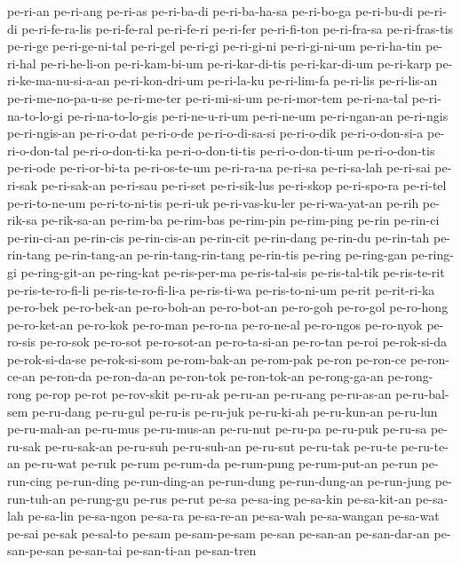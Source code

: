 {pe-ri-an pe-ri-ang pe-ri-as pe-ri-ba-di pe-ri-ba-ha-sa pe-ri-bo-ga
pe-ri-bu-di pe-ri-di pe-ri-fe-ra-lis pe-ri-fe-ral pe-ri-fe-ri pe-ri-fer
pe-ri-fi-ton pe-ri-fra-sa pe-ri-fras-tis pe-ri-ge pe-ri-ge-ni-tal
pe-ri-gel pe-ri-gi pe-ri-gi-ni pe-ri-gi-ni-um pe-ri-ha-tin pe-ri-hal
pe-ri-he-li-on pe-ri-kam-bi-um pe-ri-kar-di-tis pe-ri-kar-di-um pe-ri-karp
pe-ri-ke-ma-nu-si-a-an pe-ri-kon-dri-um pe-ri-la-ku pe-ri-lim-fa pe-ri-lis
pe-ri-lis-an pe-ri-me-no-pa-u-se pe-ri-me-ter pe-ri-mi-si-um pe-ri-mor-tem
pe-ri-na-tal pe-ri-na-to-lo-gi pe-ri-na-to-lo-gis pe-ri-ne-u-ri-um
pe-ri-ne-um pe-ri-ngan-an pe-ri-ngis pe-ri-ngis-an pe-ri-o-dat pe-ri-o-de
pe-ri-o-di-sa-si pe-ri-o-dik pe-ri-o-don-si-a pe-ri-o-don-tal
pe-ri-o-don-ti-ka pe-ri-o-don-ti-tis pe-ri-o-don-ti-um pe-ri-o-don-tis
pe-ri-ode pe-ri-or-bi-ta pe-ri-os-te-um pe-ri-ra-na pe-ri-sa pe-ri-sa-lah
pe-ri-sai pe-ri-sak pe-ri-sak-an pe-ri-sau pe-ri-set pe-ri-sik-lus
pe-ri-skop pe-ri-spo-ra pe-ri-tel pe-ri-to-ne-um pe-ri-to-ni-tis pe-ri-uk
pe-ri-vas-ku-ler pe-ri-wa-yat-an pe-rih pe-rik-sa pe-rik-sa-an pe-rim-ba
pe-rim-bas pe-rim-pin pe-rim-ping pe-rin pe-rin-ci pe-rin-ci-an pe-rin-cis
pe-rin-cis-an pe-rin-cit pe-rin-dang pe-rin-du pe-rin-tah pe-rin-tang
pe-rin-tang-an pe-rin-tang-rin-tang pe-rin-tis pe-ring pe-ring-gan
pe-ring-gi pe-ring-git-an pe-ring-kat pe-ris-per-ma pe-ris-tal-sis
pe-ris-tal-tik pe-ris-te-rit pe-ris-te-ro-fi-li pe-ris-te-ro-fi-li-a
pe-ris-ti-wa pe-ris-to-ni-um pe-rit pe-rit-ri-ka pe-ro-bek pe-ro-bek-an
pe-ro-boh-an pe-ro-bot-an pe-ro-goh pe-ro-gol pe-ro-hong pe-ro-ket-an
pe-ro-kok pe-ro-man pe-ro-na pe-ro-ne-al pe-ro-ngos pe-ro-nyok pe-ro-sis
pe-ro-sok pe-ro-sot pe-ro-sot-an pe-ro-ta-si-an pe-ro-tan pe-roi
pe-rok-si-da pe-rok-si-da-se pe-rok-si-som pe-rom-bak-an pe-rom-pak pe-ron
pe-ron-ce pe-ron-ce-an pe-ron-da pe-ron-da-an pe-ron-tok pe-ron-tok-an
pe-rong-ga-an pe-rong-rong pe-rop pe-rot pe-rov-skit pe-ru-ak pe-ru-an
pe-ru-ang pe-ru-as-an pe-ru-bal-sem pe-ru-dang pe-ru-gul pe-ru-is
pe-ru-juk pe-ru-ki-ah pe-ru-kun-an pe-ru-lun pe-ru-mah-an pe-ru-mus
pe-ru-mus-an pe-ru-nut pe-ru-pa pe-ru-puk pe-ru-sa pe-ru-sak pe-ru-sak-an
pe-ru-suh pe-ru-suh-an pe-ru-sut pe-ru-tak pe-ru-te pe-ru-te-an pe-ru-wat
pe-ruk pe-rum pe-rum-da pe-rum-pung pe-rum-put-an pe-run pe-run-cing
pe-run-ding pe-run-ding-an pe-run-dung pe-run-dung-an pe-run-jung
pe-run-tuh-an pe-rung-gu pe-rus pe-rut pe-sa pe-sa-ing pe-sa-kin
pe-sa-kit-an pe-sa-lah pe-sa-lin pe-sa-ngon pe-sa-ra pe-sa-re-an pe-sa-wah
pe-sa-wangan pe-sa-wat pe-sai pe-sak pe-sal-to pe-sam pe-sam-pe-sam pe-san
pe-san-an pe-san-dar-an pe-san-pe-san pe-san-tai pe-san-ti-an pe-san-tren
}
